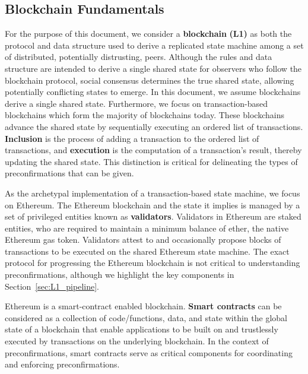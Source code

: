 \documentclass[a4paper]{article}
\theoremstyle{boldstyle}
\begin{document}
    \subsection{Blockchain Fundamentals}
    For the purpose of this document, we consider a \textbf{blockchain} \textbf{(L1)} as both the protocol and data structure used to derive a replicated state machine among a set of distributed, potentially distrusting, peers. Although the rules and data structure are intended to derive a single shared state for observers who follow the blockchain protocol, social consensus determines the true shared state, allowing potentially conflicting states to emerge. In this document, we assume blockchains derive a single shared state. Furthermore, we focus on transaction-based blockchains which form the majority of blockchains today. These blockchains advance the shared state by sequentially executing an ordered list of transactions. \textbf{Inclusion} is the process of adding a transaction to the ordered list of transactions, and \textbf{execution} is the computation of a transaction's result, thereby updating the shared state. This distinction is critical for delineating the types of preconfirmations that can be given.
    
    As the archetypal implementation of a transaction-based state machine, we focus on Ethereum.
    The Ethereum blockchain and the state it implies is managed by a set of privileged entities known as \textbf{validators}. Validators in Ethereum are staked entities, who are required to maintain a minimum balance of ether, the native Ethereum gas token. Validators attest to and occasionally propose blocks of transactions to be executed on the shared Ethereum state machine. The exact protocol for progressing the Ethereum blockchain is not critical to understanding preconfirmations, although we highlight the key components in Section~\ref{sec:L1_pipeline}.

    Ethereum is a smart-contract enabled blockchain. \textbf{Smart contracts} can be considered as a collection of code/functions, data, and state within the global state of a blockchain \cite{W:IntroductionToSmartContracts} that enable applications to be built on and trustlessly executed by transactions on the underlying blockchain. In the context of preconfirmations, smart contracts serve as critical components for coordinating and enforcing preconfirmations.
    
\end{document}
